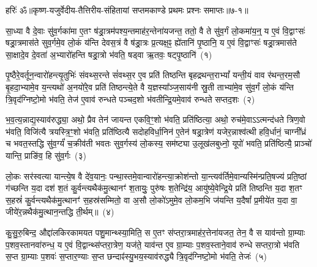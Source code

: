{हरिः॑ ॐ}{॥कृष्ण-यजुर्वेदीय-तैत्तिरीय-संहितायां सप्तमकाण्डे प्रथमः प्रश्नः समाप्तः॥७-१॥}

\setcounter{anuvakam}{0}
सा॒ध्या वै दे॒वाः सु॑व॒र्गका॑मा ए॒तꣳ ष॑ड्रा॒त्रम॑पश्य॒न्तमाह॑र॒न्तेना॑यजन्त॒ ततो॒ वै ते सु॑व॒र्गं लो॒कमा॑य॒न्॒ य ए॒वं वि॒द्वाꣳसः॑ षड्रा॒त्रमास॑ते सुव॒र्गमे॒व लो॒कं य॑न्ति देवस॒त्रं वै ष॑ड्रा॒त्रः प्र॒त्यक्ष॒ꣴ॒ ह्ये॑तानि॑ पृ॒ष्ठानि॒ य ए॒वं वि॒द्वाꣳसः॑ षड्रा॒त्रमास॑ते सा॒क्षादे॒व दे॒वता॑ अ॒भ्यारो॑हन्ति षड्रा॒त्रो भ॑वति॒ षड्वा ऋ॒तवः॒ षट्पृ॒ष्ठानि॑~(१)

पृ॒ष्ठैरे॒वर्तून॒न्वारो॑हन्त्यृ॒तुभिः॑ संवथ्स॒रन्ते सं॑वथ्स॒र ए॒व प्रति॑ तिष्ठन्ति बृहद्रथन्त॒रा\-भ्यां᳚ यन्ती॒यं वाव र॑थन्त॒रम॒सौ बृ॒हदा॒भ्यामे॒व य॒न्त्यथो॑ अ॒नयो॑रे॒व प्रति॑ तिष्ठन्त्ये॒ते वै य॒ज्ञस्या᳚ञ्ज॒साय॑नी स्रु॒ती ताभ्या॑मे॒व सु॑व॒र्गं लो॒कं य॑न्ति त्रि॒वृद॑ग्निष्टो॒मो भ॑वति॒ तेज॑ ए॒वाव॑ रुन्धते पञ्चद॒शो भ॑वतीन्द्रि॒यमे॒वाव॑ रुन्धते सप्तद॒शः~(२)

भ॒व॒त्य॒न्नाद्य॒स्याव॑रुद्ध्या॒ अथो॒ प्रैव तेन॑ जायन्त एकवि॒ꣳ॒शो भ॑वति॒ प्रति॑ष्ठित्या॒ अथो॒ रुच॑मे॒वा\-ऽऽ\-त्मन्द॑धते त्रिण॒वो भ॑वति॒ विजि॑त्यै त्रयस्त्रि॒ꣳ॒शो भ॑वति॒ प्रति॑ष्ठित्यै सदोहविर्धा॒निन॑ ए॒तेन॑ षड्रा॒त्रेण॑ यजेर॒न्नाश्व॑त्थी हवि॒र्धानं॒ चाग्नी᳚ध्रं च भवत॒स्तद्धि सु॑व॒र्ग्यं॑ च॒क्रीव॑ती भवतः सुव॒र्गस्य॑ लो॒कस्य॒ सम॑ष्ट्या उ॒लूख॑लबुध्नो॒ यूपो॑ भवति॒ प्रति॑ष्ठित्यै॒ प्राञ्चो॑ यान्ति॒ प्राङि॑व॒ हि सु॑व॒र्गः~(३)

लो॒कः सर॑स्वत्या यान्त्ये॒ष वै दे॑व॒यानः॒ पन्था॒स्तमे॒वान्वारो॑हन्त्या॒क्रोश॑न्तो या॒न्त्यव॑र्तिमे॒वान्यस्मि॑न्प्रति॒षज्य॑ प्रति॒ष्ठां ग॑च्छन्ति य॒दा दश॑ श॒तं कु॒र्वन्त्यथैक॑मु॒त्थानꣳ॑ श॒तायुः॒ पुरु॑षः श॒तेन्द्रि॑य॒ आयु॑ष्ये॒वेन्द्रि॒ये प्रति॑ तिष्ठन्ति य॒दा श॒तꣳ स॒हस्रं॑ कु॒र्वन्त्यथैक॑मु॒त्थानꣳ॑ स॒हस्र॑सम्मितो॒ वा अ॒सौ लो॒को॑\-ऽमुमे॒व लो॒कम॒भि ज॑यन्ति य॒दैषां᳚ प्र॒मीये॑त य॒दा वा॒ जीये॑र॒न्नथैक॑मु॒त्थान॒न्तद्धि ती॒र्थम्॥~(४)

{\anuvakamend[{पृ॒ष्ठानि॑ सप्तद॒शः सु॑व॒र्गो ज॑यन्ति य॒दैका॑\-दश च}]}%

कु॒सु॒रु॒बिन्द॒ औद्दा॑लकिरकामयत पशु॒मान्थ्स्या॒मिति॒ स ए॒तꣳ स॑प्तरा॒त्रमाह॑र॒त्तेना॑यजत॒ तेन॒ वै स याव॑न्तो ग्रा॒म्याः प॒शव॒स्तानवा॑रुन्ध॒ य ए॒वं वि॒द्वान्थ्स॑प्तरा॒त्रेण॒ यज॑ते॒ याव॑न्त ए॒व ग्रा॒म्याः प॒शव॒स्ताने॒वाव॑ रुन्धे सप्तरा॒त्रो भ॑वति स॒प्त ग्रा॒म्याः प॒शवः॑ स॒प्तार॒ण्याः स॒प्त छन्दाꣴ॑स्यु॒भय॒स्याव॑रुद्ध्यै त्रि॒वृद॑ग्निष्टो॒मो भ॑वति॒ तेजः॑~(५)

